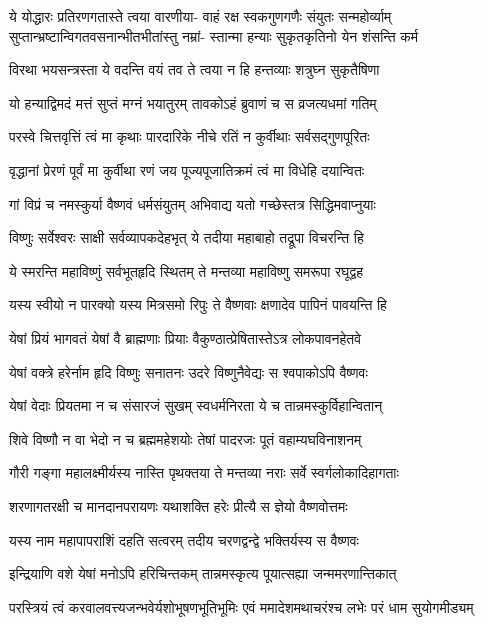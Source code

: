 \fourlineindentedshloka
{ये योद्धारः प्रतिरणगतास्ते त्वया वारणीया-}
{वाहं रक्ष स्वकगुणगणैः संयुतः सन्महोर्व्याम्}
{सुप्तान्भ्रष्टान्विगतवसनान्भीतभीतांस्तु नम्रां-}
{स्तान्मा हन्याः सुकृतकृतिनो येन शंसन्ति कर्म}%

\twolineshloka
{विरथा भयसन्त्रस्ता ये वदन्ति वयं तव}
{ते त्वया न हि हन्तव्याः शत्रुघ्न सुकृतैषिणा}%

\twolineshloka
{यो हन्याद्विमदं मत्तं सुप्तं मग्नं भयातुरम्}
{तावकोऽहं ब्रुवाणं च स व्रजत्यधमां गतिम्}%

\twolineshloka
{परस्वे चित्तवृत्तिं त्वं मा कृथाः पारदारिके}
{नीचे रतिं न कुर्वीथाः सर्वसद्गुणपूरितः}%

\twolineshloka
{वृद्धानां प्रेरणं पूर्वं मा कुर्वीथा रणं जय}
{पूज्यपूजातिक्रमं त्वं मा विधेहि दयान्वितः}%

\twolineshloka
{गां विप्रं च नमस्कुर्या वैष्णवं धर्मसंयुतम्}
{अभिवाद्य यतो गच्छेस्तत्र सिद्धिमवाप्नुयाः}%

\twolineshloka
{विष्णुः सर्वेश्वरः साक्षी सर्वव्यापकदेहभृत्}
{ये तदीया महाबाहो तद्रूपा विचरन्ति हि}%

\twolineshloka
{ये स्मरन्ति महाविष्णुं सर्वभूतहृदि स्थितम्}
{ते मन्तव्या महाविष्णु समरूपा रघूद्वह}%

\twolineshloka
{यस्य स्वीयो न पारक्यो यस्य मित्रसमो रिपुः}
{ते वैष्णवाः क्षणादेव पापिनं पावयन्ति हि}%

\twolineshloka
{येषां प्रियं भागवतं येषां वै ब्राह्मणाः प्रियाः}
{वैकुण्ठात्प्रेषितास्तेऽत्र लोकपावनहेतवे}%

\twolineshloka
{येषां वक्त्रे हरेर्नाम हृदि विष्णुः सनातनः}
{उदरे विष्णुनैवेद्यः स श्वपाकोऽपि वैष्णवः}%

\twolineshloka
{येषां वेदाः प्रियतमा न च संसारजं सुखम्}
{स्वधर्मनिरता ये च तान्नमस्कुर्विहान्वितान्}%

\twolineshloka
{शिवे विष्णौ न वा भेदो न च ब्रह्ममहेशयोः}
{तेषां पादरजः पूतं वहाम्यघविनाशनम्}%

\twolineshloka
{गौरी गङ्गा महालक्ष्मीर्यस्य नास्ति पृथक्तया}
{ते मन्तव्या नराः सर्वे स्वर्गलोकादिहागताः}%

\twolineshloka
{शरणागतरक्षी च मानदानपरायणः}
{यथाशक्ति हरेः प्रीत्यै स ज्ञेयो वैष्णवोत्तमः}%

\twolineshloka
{यस्य नाम महापापराशिं दहति सत्वरम्}
{तदीय चरणद्वन्द्वे भक्तिर्यस्य स वैष्णवः}%

\twolineshloka
{इन्द्रियाणि वशे येषां मनोऽपि हरिचिन्तकम्}
{तान्नमस्कृत्य पूयात्सह्या जन्ममरणान्तिकात्}%

\twolineshloka
{परस्त्रियं त्वं करवालवत्त्यजन्भवेर्यशोभूषणभूतिभूमिः}
{एवं ममादेशमथाचरंश्च लभेः परं धाम सुयोगमीड्यम्}%

